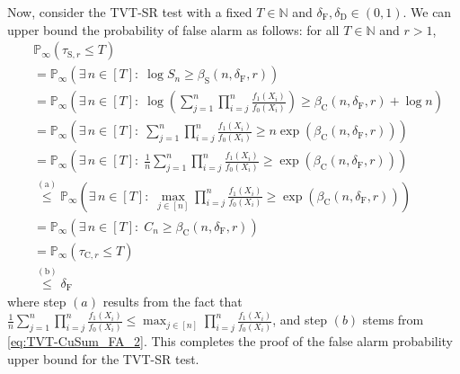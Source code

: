 \documentclass[12pt]{interact}
\newcommand{\aaaa}{\mathrm{(a)}}
\newcommand{\bbbb}{\mathrm{(b)}}
\newcommand{\lp}{\left(}
\newcommand{\rp}{\right)}
\newcommand{\lb}{\left[}
\newcommand{\rb}{\right]}
\newcommand{\mrm}{\mathrm}
\newcommand{\mbb}{\mathbb}
\renewcommand{\Pr}{\mathbb{P}}
\theoremstyle{plain}
\begin{document}
Now, consider the TVT-SR test with a fixed $T \in \mbb{N}$ and $\delta_{\mrm{F}}, \delta_{\mrm{D}} \in \lp 0, 1 \rp$. We can upper bound the probability of false alarm as follows: for all $T\in\mbb{N}$ and $r > 1$,
%
\begin{align}
&\Pr_{\infty}\lp\tau_{\mrm{S},r}\leq T\rp \nonumber\\
&=\Pr_{\infty}\lp\exists\,n\in\lb T \rb:\;\log S_{n}\geq\beta_{\mrm{S}}\lp n,\delta_{\mathrm{F}},r\rp\rp \nonumber\\
&=\Pr_{\infty}\lp \exists\,n\in\lb T \rb:\; \log\lp\sum_{j=1}^{n} \prod_{i=j}^{n} \frac{f_{1}\lp X_{i}\rp}{f_{0}\lp X_{i}\rp}\rp\geq\beta_{\mrm{C}}\lp n,\delta_{\mathrm{F}},r\rp + \log n\rp \nonumber\\
&=\Pr_{\infty}\lp \exists\,n\in\lb T \rb:\; \sum_{j=1}^{n}\prod_{i=j}^{n}\frac{f_{1}\lp X_{i}\rp}{f_{0}\lp X_{i}\rp}\geq n\exp\lp\beta_{\mrm{C}}\lp n,\delta_{\mathrm{F}},r\rp\rp\rp\nonumber\\
&=\Pr_{\infty}\lp \exists\,n\in\lb T \rb:\; \frac{1}{n}\sum_{j=1}^{n}\prod_{i=j}^{n}\frac{f_{1}\lp X_{i}\rp}{f_{0}\lp X_{i}\rp}\geq \exp\lp\beta_{\mrm{C}}\lp n,\delta_{\mathrm{F}},r\rp\rp\rp\nonumber\\
&\overset{\aaaa}{\leq}\Pr_{\infty}\lp \exists\,n\in\lb T \rb:\; \max_{j \in \lb n \rb} \prod_{i=j}^{n}\frac{f_{1}\lp X_{i}\rp}{f_{0}\lp X_{i}\rp}\geq \exp\lp\beta_{\mrm{C}}\lp n,\delta_{\mathrm{F}},r\rp\rp \rp\nonumber\\
&=\Pr_{\infty}\lp \exists\,n\in\lb T \rb:\; C_{n} \geq \beta_{\mrm{C}}\lp n,\delta_{\mathrm{F}},r\rp \rp\nonumber\\
&=\Pr_{\infty}\lp\tau_{\mrm{C},r}\leq T\rp\nonumber\\
&\overset{\bbbb}{\leq}\delta_{\mrm{F}} \label{eq:TVT-SR_FA_1}
\end{align}
where step $(a)$ results from the fact that $\frac{1}{n}\sum_{j=1}^{n}\prod_{i=j}^{n}\frac{f_{1}\lp X_{i}\rp}{f_{0}\lp X_{i}\rp} \leq \max_{j \in \lb n \rb} \prod_{i=j}^{n}\frac{f_{1}\lp X_{i}\rp}{f_{0}\lp X_{i}\rp}$, and step $(b)$ stems from \eqref{eq:TVT-CuSum_FA_2}. This completes the proof of the false alarm probability upper bound for the TVT-SR test.
\end{document}
